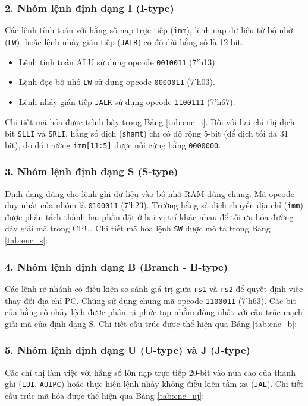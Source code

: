 \subsubsection{2. Nhóm lệnh định dạng I (I-type)}
Các lệnh tính toán với hằng số nạp trực tiếp (\texttt{imm}), lệnh nạp dữ liệu từ bộ nhớ (\texttt{LW}), hoặc lệnh nhảy gián tiếp (\texttt{JALR}) có độ dài hằng số là 12-bit.
\begin{itemize}
    \item Lệnh tính toán ALU sử dụng opcode \texttt{0010011} (7'h13).
    \item Lệnh đọc bộ nhớ \texttt{LW} sử dụng opcode \texttt{0000011} (7'h03).
    \item Lệnh nhảy gián tiếp \texttt{JALR} sử dụng opcode \texttt{1100111} (7'h67).
\end{itemize}
Chi tiết mã hóa được trình bày trong Bảng \ref{tab:enc_i}. Đối với hai chỉ thị dịch bit \texttt{SLLI} và \texttt{SRLI}, hằng số dịch (\texttt{shamt}) chỉ có độ rộng 5-bit (để dịch tối đa 31 bit), do đó trường \texttt{imm[11:5]} được nối cứng bằng \texttt{0000000}.

\subsubsection{3. Nhóm lệnh định dạng S (S-type)}
Định dạng dùng cho lệnh ghi dữ liệu vào bộ nhớ RAM dùng chung. Mã opcode duy nhất của nhóm là \texttt{0100011} (7'h23). Trường hằng số dịch chuyển địa chỉ (\texttt{imm}) được phân tách thành hai phần đặt ở hai vị trí khác nhau để tối ưu hóa đường dây giải mã trong CPU. Chi tiết mã hóa lệnh \texttt{SW} được mô tả trong Bảng \ref{tab:enc_s}:

\subsubsection{4. Nhóm lệnh định dạng B (Branch - B-type)}
Các lệnh rẽ nhánh có điều kiện so sánh giá trị giữa \texttt{rs1} và \texttt{rs2} để quyết định việc thay đổi địa chỉ PC. Chúng sử dụng chung mã opcode \texttt{1100011} (7'h63). Các bit của hằng số nhảy lệch được phân rã phức tạp nhằm đồng nhất với cấu trúc mạch giải mã của định dạng S. Chi tiết cấu trúc được thể hiện qua Bảng \ref{tab:enc_b}:

\subsubsection{5. Nhóm lệnh định dạng U (U-type) và J (J-type)}
Các chỉ thị làm việc với hằng số lớn nạp trực tiếp 20-bit vào nửa cao của thanh ghi (\texttt{LUI}, \texttt{AUIPC}) hoặc thực hiện lệnh nhảy không điều kiện tầm xa (\texttt{JAL}). Chi tiết cấu trúc mã hóa được thể hiện qua Bảng \ref{tab:enc_uj}:

